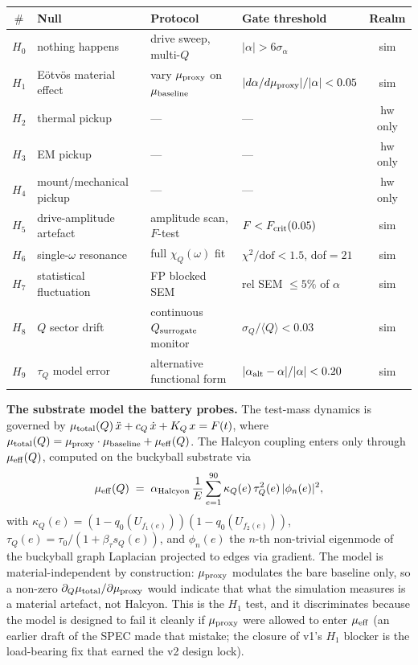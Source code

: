 \documentclass[12pt,a4paper]{article}
\theoremstyle{plain}
\theoremstyle{definition}
\theoremstyle{remark}
\begin{document}
\begin{center}
{\footnotesize
\begin{tabular}{cllp{3.7cm}c}
\toprule
$\#$ & Null & Protocol & Gate threshold & Realm \\
\midrule
$H_0$ & nothing happens & drive sweep, multi-$Q$ & $|\alpha| > 6\sigma_\alpha$ & sim \\
$H_1$ & Eötvös material effect & vary $\mu_{\rm proxy}$ on $\mu_{\rm baseline}$ & $|d\alpha/d\mu_{\rm proxy}|/|\alpha| < 0.05$ & sim \\
$H_2$ & thermal pickup & --- & --- & hw only \\
$H_3$ & EM pickup & --- & --- & hw only \\
$H_4$ & mount/mechanical pickup & --- & --- & hw only \\
$H_5$ & drive-amplitude artefact & amplitude scan, $F$-test & $F < F_{\rm crit}(0.05)$ & sim \\
$H_6$ & single-$\omega$ resonance & full $\chi_Q(\omega)$ fit & $\chi^2/\mathrm{dof} < 1.5$, dof$=21$ & sim \\
$H_7$ & statistical fluctuation & FP blocked SEM & rel SEM $\le 5\%$ of $\alpha$ & sim \\
$H_8$ & $Q$ sector drift & continuous $Q_{\rm surrogate}$ monitor & $\sigma_Q/\langle Q\rangle < 0.03$ & sim \\
$H_9$ & $\tau_Q$ model error & alternative functional form & $|\alpha_{\rm alt} - \alpha|/|\alpha| < 0.20$ & sim \\
\bottomrule
\end{tabular}
}
\end{center}

\textbf{The substrate model the battery probes.} The test-mass dynamics is governed by $\mu_{\rm total}(Q)\,\ddot{x} + c_Q\,\dot{x} + K_Q\,x = F(t)$, where $\mu_{\rm total}(Q) = \mu_{\rm proxy} \cdot \mu_{\rm baseline} + \mu_{\rm eff}(Q)$. The Halcyon coupling enters only through $\mu_{\rm eff}(Q)$, computed on the buckyball substrate via
\begin{equation}
    \mu_{\rm eff}(Q) \;=\; \alpha_{\rm Halcyon}\,\frac{1}{E}\sum_{e=1}^{90} \kappa_Q(e)\,\tau_Q^2(e)\,|\phi_n(e)|^2,
\label{eq:mu-eff-discrete}
\end{equation}
with $\kappa_Q(e) = (1 - q_0(U_{f_1(e)}))(1 - q_0(U_{f_2(e)}))$, $\tau_Q(e) = \tau_0 / (1 + \beta_\tau s_Q(e))$, and $\phi_n(e)$ the $n$-th non-trivial eigenmode of the buckyball graph Laplacian projected to edges via gradient. The model is material-independent by construction: $\mu_{\rm proxy}$ modulates the bare baseline only, so a non-zero $\partial_Q \mu_{\rm total} / \partial \mu_{\rm proxy}$ would indicate that what the simulation measures is a material artefact, not Halcyon. This is the $H_1$ test, and it discriminates because the model is designed to fail it cleanly if $\mu_{\rm proxy}$ were allowed to enter $\mu_{\rm eff}$ (an earlier draft of the SPEC made that mistake; the closure of v1's $H_1$ blocker is the load-bearing fix that earned the v2 design lock).
\end{document}
